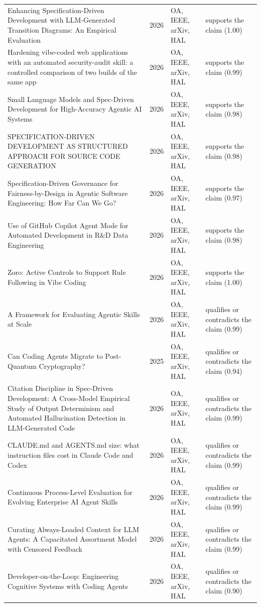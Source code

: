 \begin{longtable}{@{}%
  >{\raggedright\arraybackslash}p{}c%
  >{\raggedright\arraybackslash}p{}%
  >{\raggedright\arraybackslash}p{}@{}}
Enhancing Specification-Driven Development with LLM-Generated Transition Diagrams: An Empirical Evaluation & 2026 & OA, IEEE, arXiv, HAL & supports the claim (1.00) \\
Hardening vibe-coded web applications with an automated security-audit skill: a controlled comparison of two builds of the same app & 2026 & OA, IEEE, arXiv, HAL & supports the claim (0.99) \\
Small Language Models and Spec-Driven Development for High-Accuracy Agentic AI Systems & 2026 & OA, IEEE, arXiv, HAL & supports the claim (0.98) \\
SPECIFICATION-DRIVEN DEVELOPMENT AS STRUCTURED APPROACH FOR SOURCE CODE GENERATION & 2026 & OA, IEEE, arXiv, HAL & supports the claim (0.98) \\
Specification-Driven Governance for Fairness-by-Design in Agentic Software Engineering: How Far Can We Go? & 2026 & OA, IEEE, arXiv, HAL & supports the claim (0.97) \\
Use of GitHub Copilot Agent Mode for Automated Development in R\&D Data Engineering & 2026 & OA, IEEE, arXiv, HAL & supports the claim (0.98) \\
Zoro: Active Controls to Support Rule Following in Vibe Coding & 2026 & OA, IEEE, arXiv, HAL & supports the claim (1.00) \\
A Framework for Evaluating Agentic Skills at Scale & 2026 & OA, IEEE, arXiv, HAL & qualifies or contradicts the claim (0.99) \\
Can Coding Agents Migrate to Post-Quantum Cryptography? & 2025 & OA, IEEE, arXiv, HAL & qualifies or contradicts the claim (0.94) \\
Citation Discipline in Spec-Driven Development: A Cross-Model Empirical Study of Output Determinism and Automated Hallucination Detection in LLM-Generated Code & 2026 & OA, IEEE, arXiv, HAL & qualifies or contradicts the claim (0.99) \\
CLAUDE.md and AGENTS.md size: what instruction files cost in Claude Code and Codex & 2026 & OA, IEEE, arXiv, HAL & qualifies or contradicts the claim (0.99) \\
Continuous Process-Level Evaluation for Evolving Enterprise AI Agent Skills & 2026 & OA, IEEE, arXiv, HAL & qualifies or contradicts the claim (0.99) \\
Curating Always-Loaded Context for LLM Agents: A Capacitated Assortment Model with Censored Feedback & 2026 & OA, IEEE, arXiv, HAL & qualifies or contradicts the claim (0.99) \\
Developer-on-the-Loop: Engineering Cognitive Systems with Coding Agents & 2026 & OA, IEEE, arXiv, HAL & qualifies or contradicts the claim (0.90) \\

\end{longtable}
